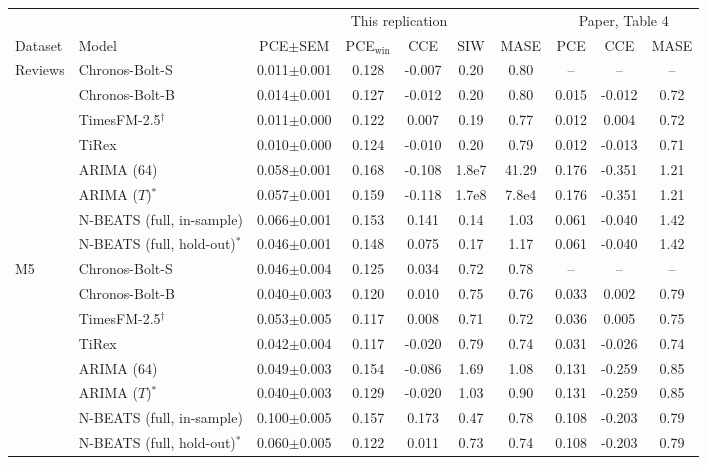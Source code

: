 \begin{tabular}{llcccccccc}
\toprule
 & & \multicolumn{5}{c}{This replication} & \multicolumn{3}{c}{Paper, Table 4} \\
\cmidrule(lr){3-7}\cmidrule(lr){8-10}
Dataset & Model & PCE$\pm$SEM & PCE$_{\mathrm{win}}$ & CCE & SIW & MASE & PCE & CCE & MASE \\
\midrule
\multirow{8}{*}{Reviews} & Chronos-Bolt-S & 0.011$\pm$0.001 & 0.128 & -0.007 & 0.20 & 0.80 & -- & -- & -- \\
 & Chronos-Bolt-B & 0.014$\pm$0.001 & 0.127 & -0.012 & 0.20 & 0.80 & 0.015 & -0.012 & 0.72 \\
 & TimesFM-2.5$^\dagger$ & 0.011$\pm$0.000 & 0.122 & 0.007 & 0.19 & 0.77 & 0.012 & 0.004 & 0.72 \\
 & TiRex & 0.010$\pm$0.000 & 0.124 & -0.010 & 0.20 & 0.79 & 0.012 & -0.013 & 0.71 \\
 & ARIMA (64) & 0.058$\pm$0.001 & 0.168 & -0.108 & 1.8e7 & 41.29 & 0.176 & -0.351 & 1.21 \\
 & ARIMA ($T$)$^\ast$ & 0.057$\pm$0.001 & 0.159 & -0.118 & 1.7e8 & 7.8e4 & 0.176 & -0.351 & 1.21 \\
 & N-BEATS (full, in-sample) & 0.066$\pm$0.001 & 0.153 & 0.141 & 0.14 & 1.03 & 0.061 & -0.040 & 1.42 \\
 & N-BEATS (full, hold-out)$^\ast$ & 0.046$\pm$0.001 & 0.148 & 0.075 & 0.17 & 1.17 & 0.061 & -0.040 & 1.42 \\
\midrule
\multirow{8}{*}{M5} & Chronos-Bolt-S & 0.046$\pm$0.004 & 0.125 & 0.034 & 0.72 & 0.78 & -- & -- & -- \\
 & Chronos-Bolt-B & 0.040$\pm$0.003 & 0.120 & 0.010 & 0.75 & 0.76 & 0.033 & 0.002 & 0.79 \\
 & TimesFM-2.5$^\dagger$ & 0.053$\pm$0.005 & 0.117 & 0.008 & 0.71 & 0.72 & 0.036 & 0.005 & 0.75 \\
 & TiRex & 0.042$\pm$0.004 & 0.117 & -0.020 & 0.79 & 0.74 & 0.031 & -0.026 & 0.74 \\
 & ARIMA (64) & 0.049$\pm$0.003 & 0.154 & -0.086 & 1.69 & 1.08 & 0.131 & -0.259 & 0.85 \\
 & ARIMA ($T$)$^\ast$ & 0.040$\pm$0.003 & 0.129 & -0.020 & 1.03 & 0.90 & 0.131 & -0.259 & 0.85 \\
 & N-BEATS (full, in-sample) & 0.100$\pm$0.005 & 0.157 & 0.173 & 0.47 & 0.78 & 0.108 & -0.203 & 0.79 \\
 & N-BEATS (full, hold-out)$^\ast$ & 0.060$\pm$0.005 & 0.122 & 0.011 & 0.73 & 0.74 & 0.108 & -0.203 & 0.79 \\

\end{tabular}
